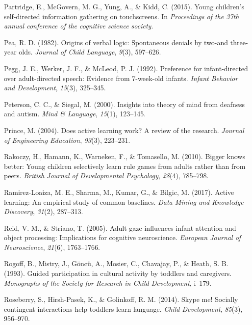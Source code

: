 \documentclass[english,floatsintext,man]{apa6}
\theoremstyle{definition}
\theoremstyle{definition}
\theoremstyle{definition}
\theoremstyle{remark}
\begin{document}
\hypertarget{ref-partridge2015young}{}
Partridge, E., McGovern, M. G., Yung, A., \& Kidd, C. (2015). Young
children's self-directed information gathering on touchscreens. In
\emph{Proceedings of the 37th annual conference of the cognitive science
society}.

\hypertarget{ref-pea1982origins}{}
Pea, R. D. (1982). Origins of verbal logic: Spontaneous denials by
two-and three-year olds. \emph{Journal of Child Language}, \emph{9}(3),
597--626.

\hypertarget{ref-pegg1992preference}{}
Pegg, J. E., Werker, J. F., \& McLeod, P. J. (1992). Preference for
infant-directed over adult-directed speech: Evidence from 7-week-old
infants. \emph{Infant Behavior and Development}, \emph{15}(3), 325--345.

\hypertarget{ref-peterson2000insights}{}
Peterson, C. C., \& Siegal, M. (2000). Insights into theory of mind from
deafness and autism. \emph{Mind \& Language}, \emph{15}(1), 123--145.

\hypertarget{ref-prince2004does}{}
Prince, M. (2004). Does active learning work? A review of the research.
\emph{Journal of Engineering Education}, \emph{93}(3), 223--231.

\hypertarget{ref-rakoczy2010bigger}{}
Rakoczy, H., Hamann, K., Warneken, F., \& Tomasello, M. (2010). Bigger
knows better: Young children selectively learn rule games from adults
rather than from peers. \emph{British Journal of Developmental
Psychology}, \emph{28}(4), 785--798.

\hypertarget{ref-ramirez2017active}{}
Ramirez-Loaiza, M. E., Sharma, M., Kumar, G., \& Bilgic, M. (2017).
Active learning: An empirical study of common baselines. \emph{Data
Mining and Knowledge Discovery}, \emph{31}(2), 287--313.

\hypertarget{ref-reid2005adult}{}
Reid, V. M., \& Striano, T. (2005). Adult gaze influences infant
attention and object processing: Implications for cognitive
neuroscience. \emph{European Journal of Neuroscience}, \emph{21}(6),
1763--1766.

\hypertarget{ref-rogoff1993guided}{}
Rogoff, B., Mistry, J., Göncü, A., Mosier, C., Chavajay, P., \& Heath,
S. B. (1993). Guided participation in cultural activity by toddlers and
caregivers. \emph{Monographs of the Society for Research in Child
Development}, i--179.

\hypertarget{ref-roseberry2014skype}{}
Roseberry, S., Hirsh-Pasek, K., \& Golinkoff, R. M. (2014). Skype me!
Socially contingent interactions help toddlers learn language.
\emph{Child Development}, \emph{85}(3), 956--970.
\end{document}

